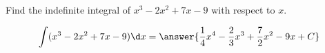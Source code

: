 \documentclass{ximera}
\author{Gregory Hartman \and Matthew Carr\and Nela Lakos}
\begin{document}
\begin{exercise}

Find the indefinite integral of $x^3-2x^2+7x-9$ with respect to $x$.
\begin{prompt}
  \[
  \int (x^3-2x^2+7x-9)\d x =\answer{\frac{1}{4}x^4-\frac{2}{3}x^3+\frac{7}{2}x^2-9x+C}
  \]
\end{prompt}

\end{exercise}
\end{document}
